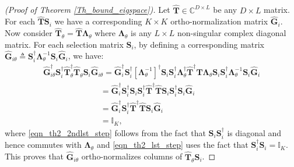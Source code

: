\documentclass[journal,comsoc]{IEEEtran}
\begin{document}
\begin{appendices}
\section{} \label{appdix2}
%
\begin{proof}[(Proof of Theorem \ref{Th_bound_eigspace})]
Let $\hat{\mathbf{T}} \in \mathbb{C}^{D \times L}$ be any $D \times L$ matrix. For each $\hat{\mathbf{T}} \mathbf{S}_i$ we have a corresponding $K \times K$ ortho-normalization matrix $\hat{\mathbf{G}}_i$. 
Now consider $\hat{\mathbf{T}}_{\theta} = \hat{\mathbf{T}} \boldsymbol{\Lambda}_{\theta}$ where $\boldsymbol{\Lambda}_{\theta}$ is any $L \times L$ non-singular complex diagonal matrix. For each selection matrix $\mathbf{S}_i$, by defining a corresponding matrix $\hat{\mathbf{G}}_{i\theta} \triangleq \mathbf{S}_i^{\dag} \boldsymbol{\Lambda}_{\theta}^{-1} \mathbf{S}_i \hat{\mathbf{G}}_i$, we have:
\begin{subequations}
\begin{flalign}
& \hat{\mathbf{G}}_{i\theta}^{\dag} \mathbf{S}_i^{\dag} \hat{\mathbf{T}}_{\theta}^{\dag} \hat{\mathbf{T}}_{\theta} \mathbf{S}_i \hat{\mathbf{G}}_{i\theta} = \hat{\mathbf{G}}_i^{\dag} \mathbf{S}_i^{\dag} {[\boldsymbol{\Lambda}_{\theta}^{-1}]}^{\dag} \mathbf{S}_i \mathbf{S}_i^{\dag} \boldsymbol{\Lambda}_{\theta}^{\dag} \hat{\mathbf{T}}^{\dag} \hat{\mathbf{T}} \boldsymbol{\Lambda}_{\theta} \mathbf{S}_i \mathbf{S}_i^{\dag} \boldsymbol{\Lambda}_{\theta}^{-1} \mathbf{S}_i \hat{\mathbf{G}}_i & \nonumber \\
&\qquad \qquad \qquad \quad = \hat{\mathbf{G}}_i^{\dag} \mathbf{S}_i^{\dag} \mathbf{S}_i \mathbf{S}_i^{\dag} \hat{\mathbf{T}}^{\dag} \hat{\mathbf{T}} \mathbf{S}_i \mathbf{S}_i^{\dag} \mathbf{S}_i \hat{\mathbf{G}}_i & \label{eqn_th2_2ndlst_step} \\
&\qquad \qquad \qquad \quad = \hat{\mathbf{G}}_i^{\dag} \mathbf{S}_i^{\dag} \hat{\mathbf{T}}^{\dag} \hat{\mathbf{T}} \mathbf{S}_i \hat{\mathbf{G}}_i & \label{eqn_th2_lst_step} \\
&\qquad \qquad \qquad \quad = \mathbb{I}_{K}, & \nonumber 
\end{flalign}
\end{subequations}
where \eqref{eqn_th2_2ndlst_step} follows from the fact that $\mathbf{S}_i\mathbf{S}_i^{\dag}$ is diagonal and hence commutes with $\boldsymbol{\Lambda}_{\theta}$ and \eqref{eqn_th2_lst_step} uses the fact that $\mathbf{S}_i^{\dag} \mathbf{S}_i = \mathbb{I}_K$. This proves that $\hat{\mathbf{G}}_{i\theta}$ ortho-normalizes columns of $\hat{\mathbf{T}}_{\theta} \mathbf{S}_i$. 


\end{proof}
\end{appendices}
\end{document}
